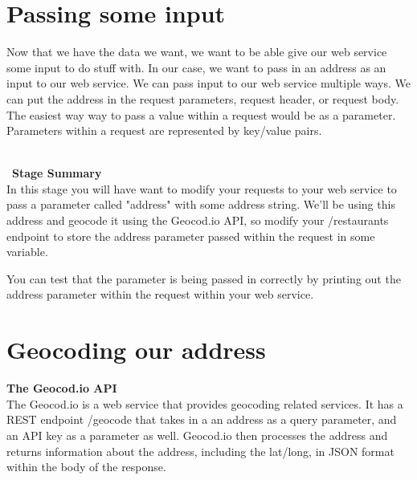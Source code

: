 \documentclass{article}
\begin{document}

\section{Passing some input}
Now that we have the data we want, we want to be able give our web service some input to do stuff with. In our case, we want to pass in an address as an input to our web service. We can pass input to our web service multiple ways. We can put the address in the request parameters, request header, or request body. The easiest way way to pass a value within a request would be as a parameter. Parameters within a request are represented by key/value pairs.

\-\\\ 
\textbf{Stage Summary}\\
In this stage you will have want to modify your requests to your web service to pass a parameter called "address" with some address string. We'll be using this address and geocode it using the Geocod.io API, so modify your /restaurants endpoint to store the address parameter passed within the request in some variable. 

\begin{info}[Hint:]
You can test that the parameter is being passed in correctly by printing out the address parameter within the request within your web service. 
\end{info}


\section{Geocoding our address}

\textbf{The Geocod.io API}\\
The Geocod.io is a web service that provides geocoding related services. It has a REST endpoint /geocode that takes in a an address as a query parameter, and an API key as a parameter as well. Geocod.io then processes the address and returns information about the address, including the lat/long, in JSON format within the body of the response. 
\end{document}
